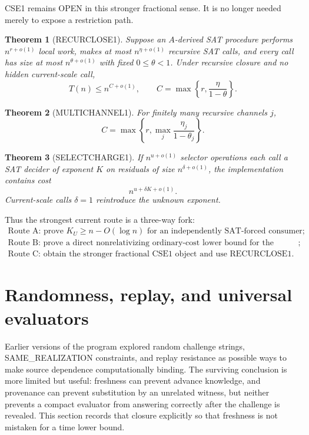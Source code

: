 \documentclass[11pt]{article}
\theoremstyle{plain}
\newtheorem{theorem}{Theorem}[section]
\theoremstyle{definition}
\theoremstyle{remark}
\begin{document}
CSE1 remains OPEN in this stronger fractional sense.  It is no longer needed
merely to expose a restriction path.

\begin{theorem}[RECURCLOSE1]
Suppose an \(A\)-derived SAT procedure performs \(n^{r+o(1)}\) local work,
makes at most \(n^{\eta+o(1)}\) recursive SAT calls, and every call has size at
most \(n^{\theta+o(1)}\) with fixed \(0\le\theta<1\).  Under recursive closure
and no hidden current-scale call,
\[
\boxed{
T(n)\le n^{C+o(1)},
\qquad
C=\max\left\{r,\frac{\eta}{1-\theta}\right\}.
}
\]
\end{theorem}

\begin{theorem}[MULTICHANNEL1]
For finitely many recursive channels \(j\),
\[
C=
\max\left\{
r,\max_j\frac{\eta_j}{1-\theta_j}
\right\}.
\]
\end{theorem}

\begin{theorem}[SELECTCHARGE1]
If \(n^{u+o(1)}\) selector operations each call a SAT decider of exponent
\(K\) on residuals of size \(n^{\delta+o(1)}\), the implementation contains
cost
\[
\boxed{n^{u+\delta K+o(1)}}.
\]
Current-scale calls \(\delta=1\) reintroduce the unknown exponent.
\end{theorem}

Thus the strongest current route is a three-way fork:
\[
\boxed{
\begin{array}{l}
\text{Route A: prove }K_U\ge n-O(\log n)\text{ for an independently SAT-forced consumer};\\
\text{Route B: prove a direct nonrelativizing ordinary-cost lower bound for the wrapped process};\\
\text{Route C: obtain the stronger fractional CSE1 object and use RECURCLOSE1.}
\end{array}}
\]

\section{Randomness, replay, and universal evaluators}

Earlier versions of the program explored random challenge strings,
SAME\_REALIZATION constraints, and replay resistance as possible ways to make
source dependence computationally binding. The surviving conclusion is more
limited but useful: freshness can prevent advance knowledge, and provenance
can prevent substitution by an unrelated witness, but neither prevents a
compact evaluator from answering correctly after the challenge is revealed.
This section records that closure explicitly so that freshness is not
mistaken for a time lower bound.
\end{document}
